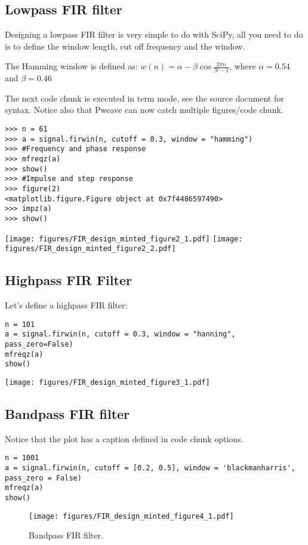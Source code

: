 \documentclass[a4paper,11pt,final]{article}
\begin{document}
\subsection{Lowpass FIR filter}

Designing a lowpass FIR filter is very simple to do with SciPy, all you
need to do is to define the window length, cut off frequency and the
window.

The Hamming window is defined as:
$w(n) = \alpha - \beta\cos\frac{2\pi n}{N-1}$, where $\alpha=0.54$ and
$\beta=0.46$

The next code chunk is executed in term mode, see the source document
for syntax. Notice also that Pweave can now catch multiple
figures/code chunk.


\begin{verbatim}
>>> n = 61
>>> a = signal.firwin(n, cutoff = 0.3, window = "hamming")
>>> #Frequency and phase response
>>> mfreqz(a)
>>> show()
>>> #Impulse and step response
>>> figure(2)
<matplotlib.figure.Figure object at 0x7f4486597490>
>>> impz(a)
>>> show()

\end{verbatim}
\texttt{[image: figures/FIR\_design\_minted\_figure2\_1.pdf]}
\texttt{[image: figures/FIR\_design\_minted\_figure2\_2.pdf]}


\subsection{Highpass FIR Filter}

Let's define a highpass FIR filter:


\begin{verbatim}
n = 101
a = signal.firwin(n, cutoff = 0.3, window = "hanning",
pass_zero=False)
mfreqz(a)
show()
\end{verbatim}
\texttt{[image: figures/FIR\_design\_minted\_figure3\_1.pdf]}


\subsection{Bandpass FIR filter}

Notice that the plot has a caption defined in code chunk options.



\begin{verbatim}
n = 1001
a = signal.firwin(n, cutoff = [0.2, 0.5], window = 'blackmanharris',
pass_zero = False)
mfreqz(a)
show()
\end{verbatim}
\begin{figure}[htpb]
\center
\texttt{[image: figures/FIR\_design\_minted\_figure4\_1.pdf]}
\caption{Bandpass FIR filter.}
\label{fig:None}
\end{figure}
\end{document}
